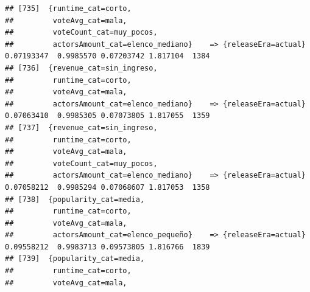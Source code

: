 \documentclass[
]{article}
\begin{document}
\begin{verbatim}
## [735]  {runtime_cat=corto,                                                                                                      
##         voteAvg_cat=mala,                                                                                                       
##         voteCount_cat=muy_pocos,                                                                                                
##         actorsAmount_cat=elenco_mediano}    => {releaseEra=actual}               0.07193347  0.9985570 0.07203742 1.817104  1384
## [736]  {revenue_cat=sin_ingreso,                                                                                                
##         runtime_cat=corto,                                                                                                      
##         voteAvg_cat=mala,                                                                                                       
##         actorsAmount_cat=elenco_mediano}    => {releaseEra=actual}               0.07063410  0.9985305 0.07073805 1.817055  1359
## [737]  {revenue_cat=sin_ingreso,                                                                                                
##         runtime_cat=corto,                                                                                                      
##         voteAvg_cat=mala,                                                                                                       
##         voteCount_cat=muy_pocos,                                                                                                
##         actorsAmount_cat=elenco_mediano}    => {releaseEra=actual}               0.07058212  0.9985294 0.07068607 1.817053  1358
## [738]  {popularity_cat=media,                                                                                                   
##         runtime_cat=corto,                                                                                                      
##         voteAvg_cat=mala,                                                                                                       
##         actorsAmount_cat=elenco_pequeño}    => {releaseEra=actual}               0.09558212  0.9983713 0.09573805 1.816766  1839
## [739]  {popularity_cat=media,                                                                                                   
##         runtime_cat=corto,                                                                                                      
##         voteAvg_cat=mala,                                                                                                       

\end{verbatim}
\end{document}
